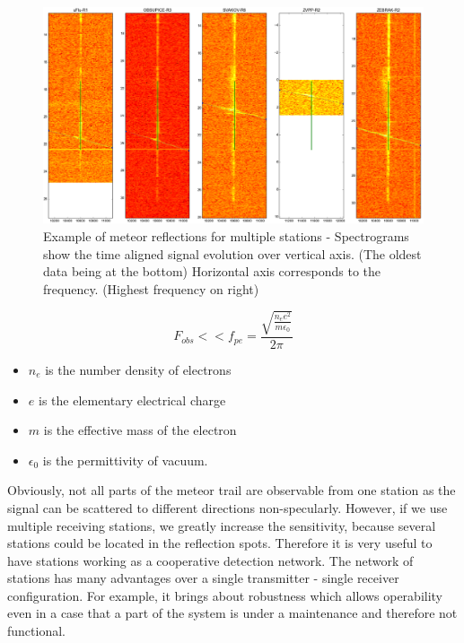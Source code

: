 \documentclass[twoside]{ctuthesis}
\theoremstyle{plain}
\theoremstyle{definition}
\theoremstyle{note}
\begin{document}
\begin{figure}
 \begin{center}
 \includegraphics[width=\textwidth]{./img/Raws_analyser.png}
 \caption{Example of meteor reflections for multiple stations - Spectrograms show the time aligned signal evolution over vertical axis. (The oldest data being at the bottom) Horizontal axis corresponds to the frequency. (Highest frequency on right)}
  \label{fig:meteor_reflections} 
 \end{center}
\end{figure}

\begin{equation}
F_{obs} << f_{pe} =\frac{\sqrt{\frac{n_e e^2}{m \epsilon_0}}}{2 \pi}
\label{equ:plasma_frequency}
\end{equation}
\begin{itemize}
\item $n_e$ is the number density of electrons
\item $e$ is the elementary electrical charge
\item $m$ is the effective mass of the electron
\item $\epsilon_0$ is the permittivity of vacuum.
\end{itemize}

Obviously, not all parts of the meteor trail are observable from one station as the signal can be scattered to different directions non-specularly.
However, if we use multiple receiving stations, we greatly increase the sensitivity, because several stations could be located in the reflection spots. Therefore it is very useful to have stations working as a cooperative detection network.
The network of stations has many advantages over a single transmitter - single receiver configuration. For example, it brings about robustness which allows operability even in a case that a part of the system is under a maintenance and therefore not functional.
                   
\end{document}
